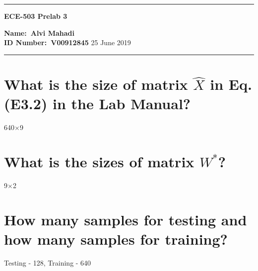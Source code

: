 \documentclass[11pt,a4paper,twoside]{article}
\begin{document}
\begin{center}
\hrule

\vspace{.4cm}
{\bf {\Huge ECE-503 Prelab 3}}
\vspace{.2cm}
\end{center}
{\bf Name:\ Alvi Mahadi }  \\
{\bf ID Number:\ V00912845} \hspace{\fill} 25 June 2019 \\
\hrule


\section{What is the size of matrix $\hat{X}$ in Eq. (E3.2) in the Lab Manual?}
640$\times$9
\section{What is the sizes of matrix $W^{*}$?}
9$\times$2
\section{How many samples for testing and how many samples for training?}
Testing - 128, Training - 640
\end{document}

